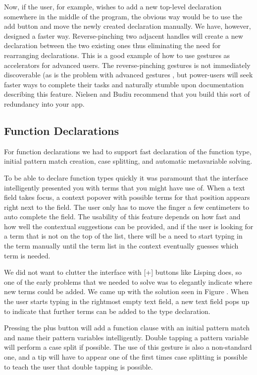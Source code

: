 Now, if the user, for example, wishes to add a new top-level declaration somewhere in the middle of the program, the obvious way would be to use the add button and move the newly created declaration manually. We have, however, designed a faster way. Reverse-pinching two adjacent handles will create a new
declaration between the two existing ones thus eliminating the  need for rearranging declarations. This is a good example of how to use gestures as accelerators for advanced users.
The reverse-pinching gestures is not immediately discoverable (as is the
problem with advanced gestures \cite[p 141]{nielsen2013mobile}, but power-users will seek faster
ways to complete their tasks and naturally stumble upon documentation
describing this feature. Nielsen and Budiu \cite[p 143]{nielsen2013mobile} recommend
that you build this sort of redundancy into your app.

\subsection{Function Declarations}
For function declarations we had to support fast declaration of the function
type, initial pattern match creation, case splitting, and automatic
metavariable solving.

To be able to declare function types quickly it was paramount that the
interface intelligently presented you with terms that you might have use of.
When a text field takes focus, a context popover with possible terms for that position
appears right next to the field. The user only has to move the finger a few
centimeters to auto complete the field. The usability of this feature depends
on how fast and how well the contextual suggestions can be provided, and if the
user is looking for a term that is not on the top of the list, there will be a
need to start typing in the term manually until the term list in the context
eventually guesses which term is needed.

We did not want to clutter the interface with [+] buttons like Lisping does, so
one of the early problems that we needed to solve was to elegantly indicate
where new terms could be added. We came up with the solution seen in Figure
. When the user starts typing in the rightmost empty text field,
a new text field pops up to indicate that further terms can be added to the
type declaration.

\missingfigure{}

Pressing the plus button will add a function clause with an initial pattern
match and name their pattern variables intelligently. Double tapping a pattern
variable will perform a case split if possible. The use of this gesture is also
a non-standard one, and a tip will have to appear one of the first times case
splitting is possible to teach the user that double tapping is possible.

